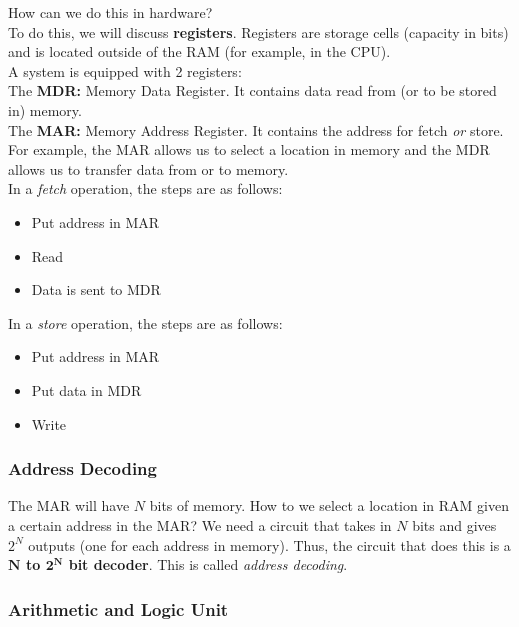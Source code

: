\documentclass[]{article}
\begin{document}
How can we do this in hardware?\\

To do this, we will discuss \textbf{registers}. Registers are storage cells (capacity in bits) and is located outside of the RAM (for example, in the CPU). \\

A system is equipped with 2 registers: \\
The \textbf{MDR:} Memory Data Register. It contains data read from (or to be stored in) memory. \\
The \textbf{MAR:} Memory Address Register. It contains the address for fetch \textit{or} store. \\

For example, the MAR allows us to select a location in memory and the MDR allows us to transfer data from or to memory.\\

In a \textit{fetch} operation, the steps are as follows:

\begin{itemize}
	\item Put address in MAR
	\item Read
	\item Data is sent to MDR
\end{itemize}

In a \textit{store} operation, the steps are as follows:

\begin{itemize}
	\item Put address in MAR
	\item Put data in MDR
	\item Write
\end{itemize}


\subsubsection{Address Decoding}
\bigbreak

The MAR will have $N$ bits of memory. How to we select a location in RAM given a certain address in the MAR? We need a circuit that takes in $N$ bits and gives $2^N$ outputs (one for each address in memory). Thus, the circuit that does this is a \textbf{$\mathbf{N}$ to $\mathbf{2^N}$ bit decoder}. This is called \textit{address decoding}.\\


\subsubsection{Arithmetic and Logic Unit}
\bigbreak
\end{document}
